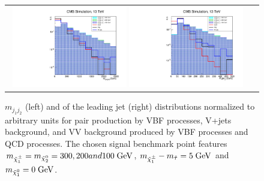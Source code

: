 \begin{figure}[tbh!]
	\centering
	\begin{tabular}{cc}
		\includegraphics[width=0.48\textwidth]{analysis/pics/h_dijetinvariantmass_prospects13tev.pdf}
		\includegraphics[width=0.48\textwidth]{analysis/pics/h_jet1pt_prospects13tev.pdf} 		
	\end{tabular}
	\caption{\ensuremath{m_{j_{1}j_{2}}} (left) and \pt of the leading jet (right) distributions normalized to arbitrary units for \charginopm \charginopm pair production by VBF processes, V+jets background, and VV background produced by VBF processes and QCD processes. The chosen signal benchmark point features \ensuremath{m_{\charginopm} = m_{\neutralinotwo} = 300, 200 and 100\gev}, \ensuremath{m_{\charginopm} - m_{\tilde{\tau}} = 5\gev} and \ensuremath{m_{\neutralinoone} = 0\gev}.}
	\label{fig:VBF_mjj_ptj1}
\end{figure}

